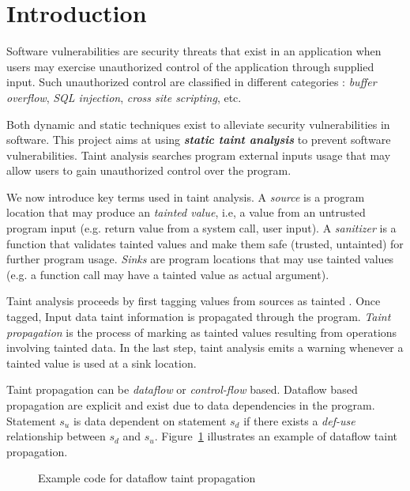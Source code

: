 \section{Introduction}
Software vulnerabilities are security threats
that exist in an application when users may exercise
unauthorized  control of the application through supplied input.
Such unauthorized control are classified in different
categories : \textit{buffer overflow}, \textit{SQL
injection}, \textit{cross site scripting}, etc.

Both dynamic and static techniques exist to alleviate
security vulnerabilities in software. 
This project aims at using \textit{\textbf{static taint analysis}}
to prevent software vulnerabilities.
Taint analysis searches program external inputs
usage that may allow users to gain unauthorized control
over the program. 

We now introduce key terms used in taint analysis.
A \textit{source} is a program location that may produce
an \textit{tainted value}, i.e, a value from an untrusted
program input (e.g. return value from a system call, user input). 
A \textit{sanitizer} is a function that validates tainted
values and make them safe (trusted, untainted) for further
program usage.
\textit{Sinks} are program locations that may use tainted
values (e.g. a function call may have a tainted value as
actual argument).

Taint analysis proceeds by first tagging values from sources
as tainted . Once tagged, Input data taint information is
propagated through the program.
\textit{Taint propagation} is the process of marking as tainted
values resulting from operations involving tainted data. In the
last step, taint analysis emits a warning whenever a tainted
value is used at a sink location.

Taint propagation can be \textit{dataflow} or \textit{control-flow} based.
Dataflow based propagation are explicit and exist due to data
dependencies in the program. Statement $s_u$ is data dependent
on statement $s_d$ if there exists a \textit{def-use} relationship
between $s_d$ and $s_u$. Figure~\ref{fig:dfpropagation} illustrates
an example of dataflow taint propagation. 

\begin{figure}[!h]
\begin{center}
\end{center}
\caption{Example code for dataflow taint propagation}
\label{fig:dfpropagation}
\end{figure}

